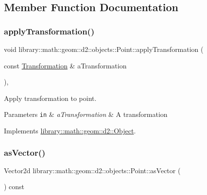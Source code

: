 \subsection{Member Function Documentation}
\mbox{\label{classlibrary_1_1math_1_1geom_1_1d2_1_1objects_1_1_point_a71d3ef79dbffcd2568d1a2c6bad807d7}} 
\subsubsection{\texorpdfstring{apply\+Transformation()}{applyTransformation()}}
{\footnotesize\ttfamily void library\+::math\+::geom\+::d2\+::objects\+::\+Point\+::apply\+Transformation (\begin{DoxyParamCaption}\item[{const \hyperlink{classlibrary_1_1math_1_1geom_1_1d2_1_1_transformation}{Transformation} \&}]{a\+Transformation }\end{DoxyParamCaption})\hspace{0.3cm}{\ttfamily [override]}, {\ttfamily [virtual]}}



Apply transformation to point. 


\begin{DoxyParams}[1]{Parameters}
\mbox{\tt in}  & {\em a\+Transformation} & A transformation \\
\hline
\end{DoxyParams}


Implements \hyperlink{classlibrary_1_1math_1_1geom_1_1d2_1_1_object_a289589fb6e9e7a2c4ca4976a1544def5}{library\+::math\+::geom\+::d2\+::\+Object}.

\mbox{\label{classlibrary_1_1math_1_1geom_1_1d2_1_1objects_1_1_point_a570cc81d15674537baa36e0e1b251612}} 
\subsubsection{\texorpdfstring{as\+Vector()}{asVector()}}
{\footnotesize\ttfamily Vector2d library\+::math\+::geom\+::d2\+::objects\+::\+Point\+::as\+Vector (\begin{DoxyParamCaption}{ }\end{DoxyParamCaption}) const}



